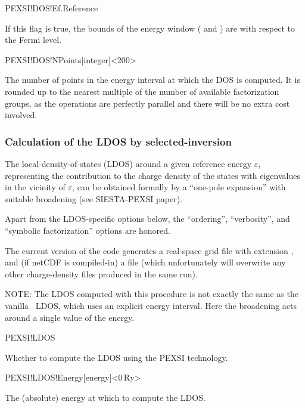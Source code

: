\begin{fdflogicalT}{PEXSI!DOS!Ef.Reference}

  If this flag is true, the bounds of the energy window
  ( and ) are with respect to
  the Fermi level.

\end{fdflogicalT}

\begin{fdfentry}{PEXSI!DOS!NPoints}[integer]<200>

  The number of points in the energy interval at which the DOS is
  computed. It is rounded up to the nearest multiple of the number of
  available factorization groups, as the operations are perfectly
  parallel and there will be no extra cost involved.
  
\end{fdfentry}

\subsubsection{Calculation of the LDOS by selected-inversion}
\label{pexsi-ldos}

The local-density-of-states (LDOS) around a given reference energy
$\varepsilon$, representing the contribution to the charge density of
the states with eigenvalues in the vicinity of $\varepsilon$, can be
obtained formally by a ``one-pole expansion'' with suitable broadening
(see SIESTA-PEXSI paper).

Apart from the LDOS-specific options below, the ``ordering'',
``verbosity'', and ``symbolic factorization'' options are honored.

The current version of the code generates a real-space grid file with
extension , and (if netCDF is compiled-in) a file
 (which unfortunately will overwrite any other
charge-density files produced in the same run).

NOTE: The LDOS computed with this procedure is not exactly the same as
the vanilla \siesta\ LDOS, which uses an explicit energy
interval. Here the broadening acts around a single value of the
energy.


\begin{fdflogicalF}{PEXSI!LDOS}

  Whether to compute the LDOS using the PEXSI technology.
  
\end{fdflogicalF}

\begin{fdfentry}{PEXSI!LDOS!Energy}[energy]<$0\,\mathrm{Ry}$>

  The (absolute) energy at which to compute the LDOS.

\end{fdfentry}

